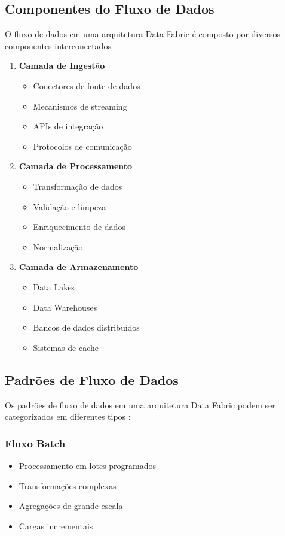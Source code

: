 \subsection{Componentes do Fluxo de Dados}

O fluxo de dados em uma arquitetura Data Fabric é composto por diversos componentes interconectados \cite{hechler2023data}:

\begin{enumerate}
\item \textbf{Camada de Ingestão}
\begin{itemize}
\item Conectores de fonte de dados
\item Mecanismos de streaming
\item APIs de integração
\item Protocolos de comunicação
\end{itemize}

\item \textbf{Camada de Processamento}
\begin{itemize}
    \item Transformação de dados
    \item Validação e limpeza
    \item Enriquecimento de dados
    \item Normalização
\end{itemize}

\item \textbf{Camada de Armazenamento}
\begin{itemize}
    \item Data Lakes
    \item Data Warehouses
    \item Bancos de dados distribuídos
    \item Sistemas de cache
\end{itemize}
\end{enumerate}

\subsection{Padrões de Fluxo de Dados}

Os padrões de fluxo de dados em uma arquitetura Data Fabric podem ser categorizados em diferentes tipos \cite{blohm2024data}:

\subsubsection{Fluxo Batch}
\begin{itemize}
\item Processamento em lotes programados
\item Transformações complexas
\item Agregações de grande escala
\item Cargas incrementais
\end{itemize}

